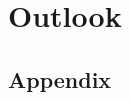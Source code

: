 \documentclass[12pt]{report}
\begin{document}

\chapter{Outlook}



\clearpage


\clearpage
\section{Appendix}
\end{document}

